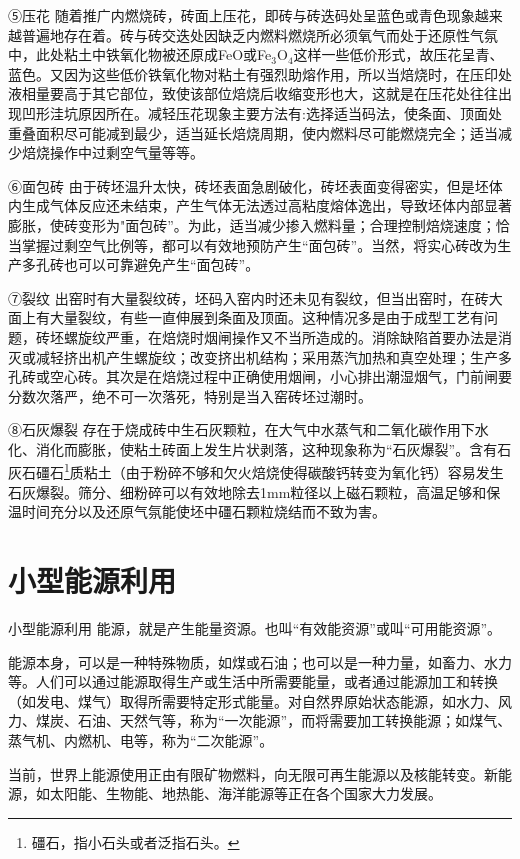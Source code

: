 \documentclass{ctexbook}
\begin{document}
⑤压花 随着推广内燃烧砖，砖面上压花，即砖与砖迭码处呈蓝色或青色现象越来越普遍地存在着。砖与砖交迭处因缺乏内燃料燃烧所必须氧气而处于还原性气氛中，此处粘土中铁氧化物被还原成FeO或Fe$_3$O$_4$这样一些低价形式，故压花呈青、蓝色。又因为这些低价铁氧化物对粘土有强烈助熔作用，所以当焙烧时，在压印处液相量要高于其它部位，致使该部位焙烧后收缩变形也大，这就是在压花处往往出现凹形洼坑原因所在。减轻压花现象主要方法有:选择适当码法，使条面、顶面处重叠面积尽可能减到最少，适当延长焙烧周期，使内燃料尽可能燃烧完全；适当减少焙烧操作中过剩空气量等等。

⑥面包砖 由于砖坯温升太快，砖坯表面急剧破化，砖坯表面变得密实，但是坯体内生成气体反应还未结束，产生气体无法透过高粘度熔体逸出，导致坯体内部显著膨胀，使砖变形为"面包砖”。为此，适当减少掺入燃料量；合理控制焙烧速度；恰当掌握过剩空气比例等，都可以有效地预防产生“面包砖”。当然，将实心砖改为生产多孔砖也可以可靠避免产生“面包砖”。

⑦裂纹 出窑时有大量裂纹砖，坯码入窑内时还未见有裂纹，但当出窑时，在砖大面上有大量裂纹，有些一直伸展到条面及顶面。这种情况多是由于成型工艺有问题，砖坯螺旋纹严重，在焙烧时烟闸操作又不当所造成的。消除缺陷首要办法是消灭或减轻挤出机产生螺旋纹；改变挤出机结构；采用蒸汽加热和真空处理；生产多孔砖或空心砖。其次是在焙烧过程中正确使用烟闸，小心排出潮湿烟气，门前闸要分数次落严，绝不可一次落死，特别是当入窑砖坯过潮时。

⑧石灰爆裂 存在于烧成砖中生石灰颗粒，在大气中水蒸气和二氧化碳作用下水化、消化而膨胀，使粘土砖面上发生片状剥落，这种现象称为“石灰爆裂”。含有石灰石礓石\footnote{礓石，指小石头或者泛指石头。}质粘土（由于粉碎不够和欠火焙烧使得碳酸钙转变为氧化钙）容易发生石灰爆裂。筛分、细粉碎可以有效地除去1mm粒径以上磁石颗粒，高温足够和保温时间充分以及还原气氛能使坯中礓石颗粒烧结而不致为害。






      
\chapter{小型能源利用}
小型能源利用
能源，就是产生能量资源。也叫“有效能资源”或叫“可用能资源”。

能源本身，可以是一种特殊物质，如煤或石油；也可以是一种力量，如畜力、水力等。人们可以通过能源取得生产或生活中所需要能量，或者通过能源加工和转换（如发电、煤气）取得所需要特定形式能量。对自然界原始状态能源，如水力、风力、煤炭、石油、天然气等，称为“一次能源”，而将需要加工转换能源；如煤气、蒸气机、内燃机、电等，称为“二次能源”。

当前，世界上能源使用正由有限矿物燃料，向无限可再生能源以及核能转变。新能源，如太阳能、生物能、地热能、海洋能源等正在各个国家大力发展。
\end{document}
